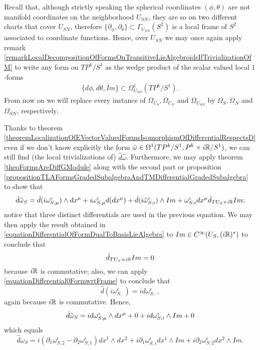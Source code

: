 \begin{example}[$TP^k/S^1$ over $S^2$]
Recall that, although strictly speaking the spherical coordinates $(\phi, \theta)$ are not manifold coordinates on the neighborhood $U_{SN}$, they are so on two different charts that cover $U_{SN}$, therefore $\{\partial_\phi, \partial_\theta\} \subset \Gamma_{U_{SN}}(S^2)$ is a local frame of $S^2$ associated to coordinate functions. Hence, over $U_{SN}$ we may once again apply remark \ref{remarkLocalDecompositionOfFormsOnTransitiveLieAlgebroidsIfTrivializationOfM} to write any form on $TP^k/S^1$ as the wedge product of the scalar valued local $1$-forms
\begin{align*}
    \{d\phi, d\theta, Im\} \subset \Omega^1_{U_{SN}}(TP^k/S^1).
\end{align*} 
From now on we will replace every instance of $\Omega_{U_{S}}, \Omega_{U_{N}}$ and $\Omega_{U_{SN}}$ by $\Omega_{S}, \Omega_{N}$ and $\Omega_{SN}$, respectively.

Thanks to theorem \ref{theoremLocalizationOfEVectorValuedFormsIsomorphismOfDifferentialRespectsD} even if we don't know explicitly the form $\hat \omega \in \Omega^1(TP^k/S^1, P^k \times i\mathbb{R}/S^1)$, we can still find (the local trivializations of) $\hat d \hat \omega$. Furthermore, we may apply theorem \ref{theoFormsAreDiffGModule} along with the second part or proposition \ref{propositionTLAFormsGradedSubalgebraAndTMDifferentialGradedSubalgebra} to show that
\begin{equation*}
    \hat d \hat \omega_S = \hat d (i\omega^\epsilon_{S;\mu}) \wedge dx^\mu + i  \omega^\epsilon_{S;\mu} d(dx^\mu) + \hat d(i \hat \omega^\epsilon_{S;i}) \wedge Im + \omega^\epsilon_{S;i} dx^\mu \hat d_{TU_S \times i\RR} Im;
\end{equation*}
notice that three distinct differentials are used in the previous equation. We may then apply the result obtained in \eqref{equationDifferentialOfFormDualToBasisLieAlgebra} to $Im \in C^\infty(U_S, (i \mathbb{R})^*)$ to conclude that 
$$\hat d_{TU_S \times i\mathbb{R}} Im = 0$$
because $i\mathbb{R}$ is commutative; also, we can apply \eqref{equationDifferential0FormwrtFrame} to conclude that
$$ \hat d (i \omega^\epsilon_{S;\cdot}) = i d\omega^\epsilon_{S;\cdot},$$
again because $i\mathbb{R}$ is commutative. Hence,
\begin{equation*}
    \hat d \hat \omega_S = i d\omega^\epsilon_{S;\mu}\wedge dx^\mu + 0 + i d\omega^\epsilon_{S;i} \wedge Im + 0\\
\end{equation*}
which equals
\begin{equation}\label{equationCurvatureGeneralConnectionCh2S2}
    \hat d \omega_S = i(\partial_1 \omega^\epsilon_{S;2} - \partial_2 \omega^\epsilon_{S;1}) dx^1 \wedge dx^2 + i \partial_1 \omega^\epsilon_{S;i} dx^1 \wedge Im + i \partial_2 \omega^\epsilon_{S;2} dx^2 \wedge Im.
\end{equation}

\end{example}

